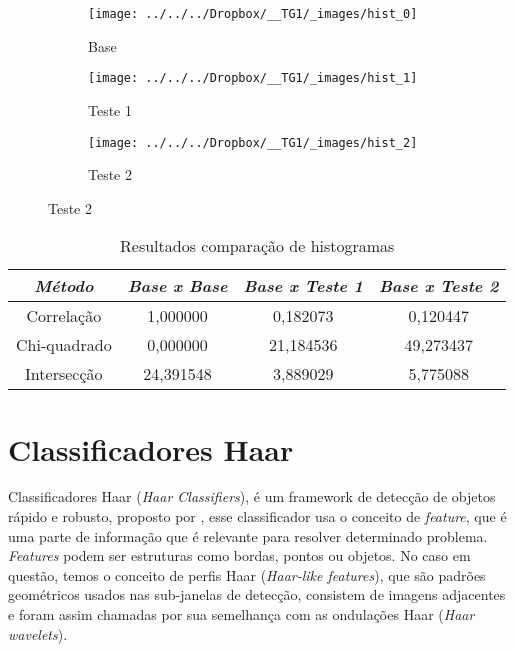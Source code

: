 \documentclass[ecp,tc]{iiufrgs}
\begin{document}
\begin{figure}[h]
	\centering
	\caption{Figuras de exemplo para comparação de histogramas}
	\begin{subfigure}[b]{0.3\textwidth}
		\texttt{[image: ../../../Dropbox/\_\_TG1/\_images/hist\_0]}
		\caption{Base}
		\label{fig:hist_0}
	\end{subfigure}
	\quad
	\begin{subfigure}[b]{0.3\textwidth}
		\texttt{[image: ../../../Dropbox/\_\_TG1/\_images/hist\_1]}
		\caption{Teste 1}
		\label{fig:hist_1}
	\end{subfigure}
	\quad
	\begin{subfigure}[b]{0.3\textwidth}
		\texttt{[image: ../../../Dropbox/\_\_TG1/\_images/hist\_2]}
		\caption{Teste 2}
		\label{fig:hist_2}
	\end{subfigure}
	\label{fig:hist}
\end{figure}

\begin{table}[h]
	\caption{Resultados comparação de histogramas}
	\begin{center}
		\begin{tabular}{c|c|c|c}
			\textit{Método}  &   \textit{Base x Base}  &   \textit{Base x Teste 1} & \textit{Base x Teste 2}  \\
			\hline
			\hline
			Correlação & 1,000000 &	0,182073 & 0,120447 \\
			\hline
			Chi-quadrado & 0,000000 & 21,184536 & 49,273437 \\
			\hline
			Intersecção & 24,391548 & 3,889029 & 5,775088 \\
			\hline
		\end{tabular}
	\end{center}
	\label{tbl:hist}
\end{table}


\section{Classificadores Haar}
\label{haar}
Classificadores Haar (\textit{Haar Classifiers}), é um framework de detecção de objetos rápido e robusto, proposto por , esse classificador usa o conceito de \textit{feature}, que é uma parte de informação que é relevante para resolver determinado problema. \textit{Features} podem ser estruturas como bordas, pontos ou objetos. No caso em questão, temos o conceito de perfis Haar (\textit{Haar-like features}), que são padrões geométricos usados nas sub-janelas de detecção, consistem de imagens adjacentes e foram assim chamadas por sua semelhança com as ondulações Haar (\textit{Haar wavelets}).
\end{document}
